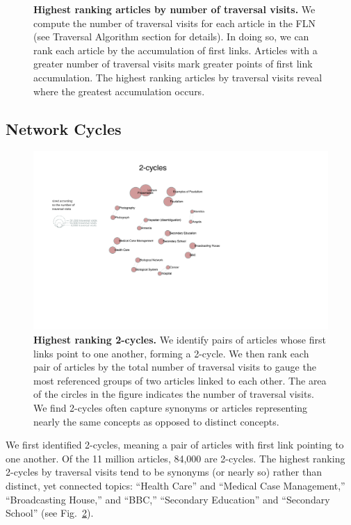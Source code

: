 \documentclass[11pt]{report}
\begin{document}
\begin{figure}[tp!]
  \caption{
    \textbf{Highest ranking articles by number of traversal visits.}
We compute the number of traversal visits for each article in the FLN (see 
Traversal Algorithm section for details). In doing so, we can rank each article
by the accumulation of first links. Articles with a greater number of traversal visits
mark greater points of first link accumulation. The highest ranking articles by traversal visits reveal where the greatest accumulation occurs.}
  \label{fig:highest visits}
\end{figure}



\subsection{Network Cycles}

\begin{figure}[tp!]
  \includegraphics[width=\textwidth]{graphics/2_cycles.pdf}
  \caption{
    \textbf{Highest ranking 2-cycles.}
We identify pairs of articles whose first links point to one another, forming
a 2-cycle. We then rank each pair of articles by the total number of 
traversal visits to gauge the most referenced groups of two articles linked
to each other. The area of the circles in the figure indicates the number of traversal visits. We find 2-cycles often capture synonyms or articles representing nearly the 
same concepts as opposed to distinct concepts.}
  \label{fig:2-cycles}
\end{figure}
We first identified 2-cycles, meaning a pair of articles with first link pointing to one another.
Of the 11 million articles, 84,000 are 2-cycles. 
The highest ranking 2-cycles by traversal visits tend to be synonyms (or nearly so) rather than distinct, yet connected topics:
``Health Care'' and ``Medical Case Management,'' ``Broadcasting House,'' and ``BBC,'' ``Secondary Education'' and ``Secondary School'' 
(see Fig.~\ref{fig:2-cycles}).
\end{document}
